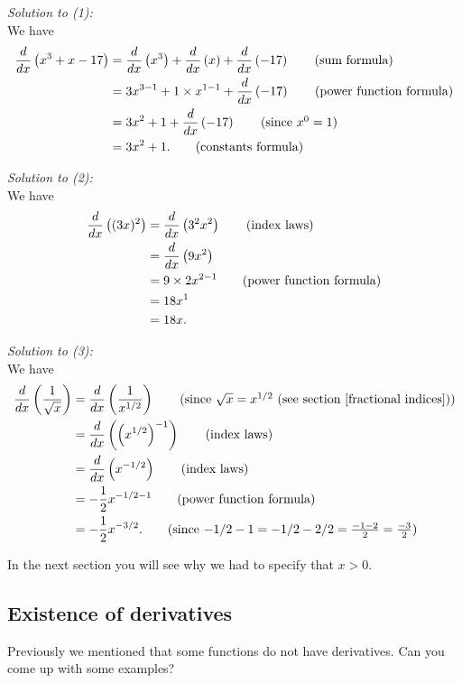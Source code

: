 \noindent \textit{Solution to (1):} \\
We have
\begin{align*}
\frac{d}{dx}\left(x^3 + x - 17\right) & = \frac{d}{dx}\left(x^3\right) + \frac{d}{dx}\left(x\right) + \frac{d}{dx}\left(-17\right) \tag{sum formula} \\
	& = 3x^{3-1} + 1\times x^{1-1} + \frac{d}{dx}\left(-17\right) \tag{power function formula} \\
	& = 3x^2 + 1 + \frac{d}{dx}\left(-17\right) \tag{since $x^0 = 1$} \\
	& = 3x^2 + 1. \tag{constants formula}
\end{align*}
\bigskip

\noindent \textit{Solution to (2):} \\
We have
\begin{align*}
\frac{d}{dx}\left((3x)^2\right) & = \frac{d}{dx}\left(3^2x^2\right) \tag{index laws} \\
		& =  \frac{d}{dx}\left(9x^2\right) \\
		& = 9\times2x^{2-1} \tag{power function formula} \\
		& = 18x^1 \\
		& = 18x.
\end{align*}
\bigskip

\noindent \textit{Solution to (3):} \\
We have
\begin{align*}
\frac{d}{dx}\brac{\frac{1}{\sqrt{x}}} & = \frac{d}{dx}\brac{\frac{1}{x^{1/2}}} \tag{since $\sqrt{x} = x^{1/2}$ (see section \ref{fractional indices})} \\
		& = \frac{d}{dx}\brac{\brac{x^{1/2}}^{-1}} \tag{index laws} \\
		& = \frac{d}{dx}\brac{x^{-1/2}} \tag{index laws} \\
		& = -\frac{1}{2}x^{-1/2-1} \tag{power function formula} \\
		& = -\frac{1}{2}x^{-3/2}. \tag{since $-1/2 - 1 = -1/2 - 2/2 = \frac{-1-2}{2} = \frac{-3}{2}$}
\end{align*}

In the next section you will see why we had to specify that $x > 0$.

\subsection{Existence of derivatives} \label{not have derivatives}
Previously we mentioned that some functions do not have derivatives. Can you come up with some examples? \\

